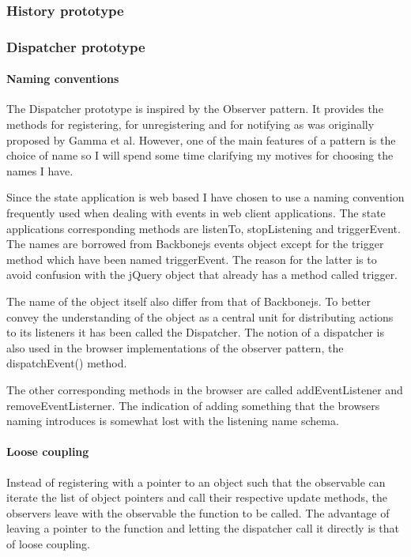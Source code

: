 \documentclass[english]{ifimaster}
\begin{document}
\subsubsection{History prototype}



\subsubsection{Dispatcher prototype}

\paragraph{Naming conventions}
The Dispatcher prototype is inspired by the Observer pattern. It provides the methods for registering, for unregistering and for notifying as was originally proposed by Gamma et al. However, one of the main features of a pattern is the choice of name\parencite[p. 3]{gamma} so I will spend some time clarifying my motives for choosing the names I have. 

Since the state application is web based I have chosen to use a naming convention frequently used when dealing with events in web client applications. The state applications corresponding methods are listenTo, stopListening and triggerEvent. The names are borrowed from Backbonejs events object except for the trigger method which have been named triggerEvent. The reason for the latter is to avoid confusion with the jQuery object that already has a method called trigger.

The name of the object itself also differ from that of Backbonejs. To better convey the understanding of the object as a central unit for distributing actions to its listeners it has been called the Dispatcher. The notion of a dispatcher is also used in the browser implementations of the observer pattern, the dispatchEvent() method. 

The other corresponding methods in the browser are called addEventListener and removeEventListerner. The indication of adding something that the browsers naming introduces is somewhat lost with the listening name schema. 

\paragraph{Loose coupling} Instead of registering with a pointer to an object such that the observable can iterate the list of object pointers and call their respective update methods, the observers leave with the observable the function to be called. The advantage of leaving a pointer to the function and letting the dispatcher call it directly is that of loose coupling.
\end{document}
